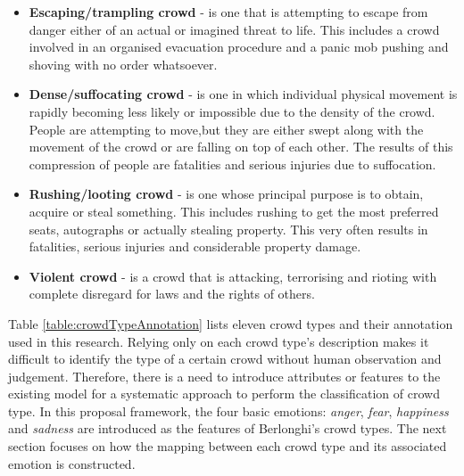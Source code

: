 \begin{itemize}
\item \textbf{Escaping/trampling crowd} - is one that is attempting to escape from danger either of an actual or imagined threat to life. This includes a crowd involved in an organised evacuation procedure and a panic mob pushing and shoving with no order whatsoever.
\item \textbf{Dense/suffocating crowd} - is one in which individual physical movement is rapidly becoming less likely or impossible due to the density of the crowd. People are attempting to move,but they are either swept along with the movement of the crowd or are falling on top of each other. The results of this compression of people are fatalities and serious injuries due to suffocation.
\item \textbf{Rushing/looting crowd} - is one whose principal purpose is to obtain, acquire or steal something. This includes rushing to get the most preferred seats, autographs or actually stealing property. This very often results in fatalities, serious injuries and considerable property damage.
\item \textbf{Violent crowd} - is a crowd that is attacking, terrorising and rioting with complete disregard for laws and the rights of others.
\end{itemize}

Table \ref{table:crowdTypeAnnotation} lists eleven crowd types and their annotation used in this research. Relying only on each crowd type's description makes it difficult to identify the type of a certain crowd without human observation and judgement. Therefore, there is a need to introduce attributes or features to the existing model for a systematic approach to perform the classification of crowd type. In this proposal framework, the four basic emotions: \textit{anger}, \textit{fear}, \textit{happiness} and \textit{sadness} are introduced as the features of Berlonghi's crowd types. The next section focuses on how the mapping between each crowd type and its associated emotion is constructed.

